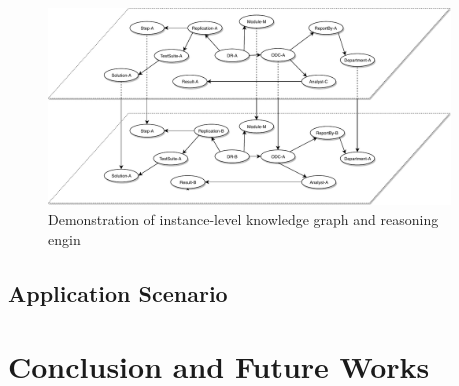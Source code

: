 \documentclass[12pt] {article}
\begin{document}
\begin{figure}[h]
    \centering
    \includegraphics[width=0.95\textwidth]{../figures/KnowledgeGraph.pdf}
    \caption{Demonstration of instance-level knowledge graph and reasoning engin}
    \label{fig:kg}
\end{figure}
\subsection{Application Scenario}

\section{Conclusion and Future Works}


\pagebreak
\end{document}
